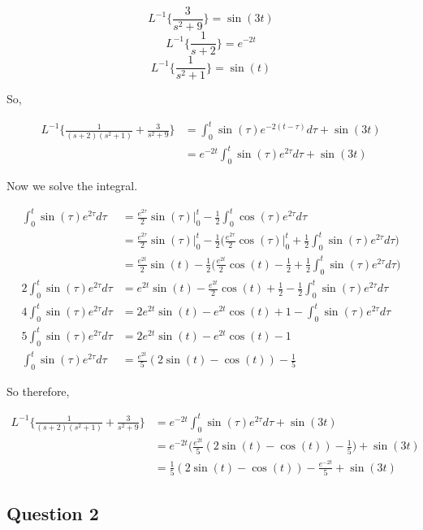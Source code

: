 \documentclass[titlepage]{article}
\begin{document}
$$L^{-1}\{\frac{3}{s^2 + 9}\} = \sin(3t)$$
$$L^{-1}\{\frac{1}{s+2}\} = e^{-2t}$$
$$L^{-1}\{\frac{1}{s^2 + 1}\} = \sin(t)$$

So,

\begin{align*}
    L^{-1}\{\frac{1}{(s+2)(s^2 + 1)} + \frac{3}{s^2 + 9}\} &=
        \int_{0}^{t} \sin(\tau)e^{-2(t - \tau)} d\tau + \sin(3t)
        \\ &= e^{-2t}\int_{0}^{t} \sin(\tau)e^{2\tau} d\tau + \sin(3t)
\end{align*}

Now we solve the integral.

\begin{align*}
    \int_{0}^{t} \sin(\tau)e^{2\tau} d\tau
    & =\frac{e^{2\tau}}{2}\sin(\tau) \bigg|_0^t - \frac{1}{2}\int_{0}^{t} \cos(\tau)e^{2\tau} d\tau
    \\ &=\frac{e^{2\tau}}{2}\sin(\tau) \bigg|_0^t
    - \frac{1}{2}\bigg(\frac{e^{2\tau}}{2}\cos(\tau) \bigg|_0^t + \frac{1}{2}\int_{0}^{t} \sin(\tau)e^{2\tau} d\tau \bigg)
    \\ &=\frac{e^{2t}}{2}\sin(t)
    - \frac{1}{2}\bigg(\frac{e^{2t}}{2}\cos(t) - \frac{1}{2} + \frac{1}{2}\int_{0}^{t} \sin(\tau)e^{2\tau} d\tau \bigg)
    \\ 2 \int_{0}^{t} \sin(\tau)e^{2\tau} d\tau &= e^{2t}\sin(t)
    - \frac{e^{2t}}{2}\cos(t) + \frac{1}{2} - \frac{1}{2}\int_{0}^{t} \sin(\tau)e^{2\tau} d\tau
    \\ 4\int_{0}^{t} \sin(\tau)e^{2\tau} d\tau &= 2e^{2t}\sin(t)
    - e^{2t}\cos(t) + 1 - \int_{0}^{t} \sin(\tau)e^{2\tau} d\tau
    \\ 5\int_{0}^{t} \sin(\tau)e^{2\tau} d\tau &= 2e^{2t}\sin(t)
    - e^{2t}\cos(t) - 1
    \\ \int_{0}^{t} \sin(\tau)e^{2\tau} d\tau &= \frac{e^{2t}}{5}(2\sin(t) - \cos(t)) - \frac{1}{5}
\end{align*}

So therefore,

\begin{align*}
    L^{-1}\{\frac{1}{(s+2)(s^2 + 1)} + \frac{3}{s^2 + 9}\}
        &= e^{-2t}\int_{0}^{t} \sin(\tau)e^{2\tau} d\tau + \sin(3t)
    \\ &= e^{-2t}\bigg(\frac{e^{2t}}{5}(2\sin(t) - \cos(t)) - \frac{1}{5}\bigg) + \sin(3t)
    \\ &= \frac{1}{5}(2\sin(t) - \cos(t)) - \frac{e^{-2t}}{5} + \sin(3t)
\end{align*}

\subsection*{Question 2}
\end{document}
